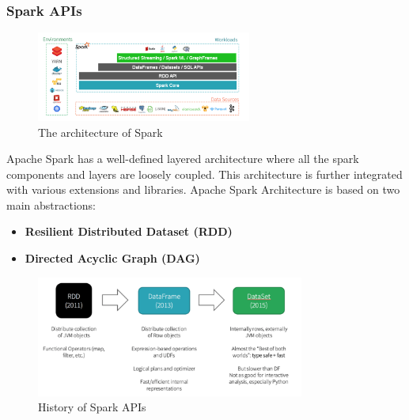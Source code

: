 \documentclass[10pt,a4paper]{article}
\begin{document}
 \subsubsection{Spark APIs}
 \begin{figure}[ht!]
 \hfill \includegraphics[width=200pt]{images/spark-arch}
 \hspace*{\fill}
 \caption{The architecture of Spark}
 \end{figure} 
 Apache Spark has a well-defined layered architecture where all the spark components and layers are loosely coupled. This architecture is further integrated with various extensions and libraries. Apache Spark Architecture is based on two main abstractions:
 \begin{itemize}
 	\item \textbf{Resilient Distributed Dataset (RDD)}
 	\item \textbf{Directed Acyclic Graph (DAG)}
 \end{itemize}
  \begin{figure}[ht!]
 \hfill \includegraphics[width=250pt]{images/spark-api-history}
 \hspace*{\fill}
 \caption{History of Spark APIs}
 \end{figure} 
\end{document}

